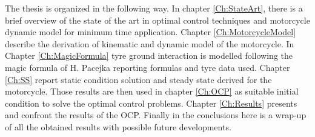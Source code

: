 The thesis is organized in the following way. 
In chapter \ref{Ch:StateArt}, there is a brief overview of the state of the art in optimal control techniques and motorcycle dynamic model for minimum time application.
Chapter \ref{Ch:MotorcycleModel} describe the derivation of kinematic and dynamic model of the motorcycle. 
In Chapter \ref{Ch:MagicFormula} tyre ground interaction is modelled following the magic formula of H. Pacejka\cite{pacejka2012tire} reporting formulas and tyre data used.
Chapter \ref{Ch:SS} report static condition solution and steady state derived for the motorcycle. Those results are then used in chapter \ref{Ch:OCP} as suitable initial condition to solve the optimal control problems.  
Chapter \ref{Ch:Results} presents and confront the results of the OCP.
Finally in the conclusions here is a wrap-up of all the obtained results with possible future developments.